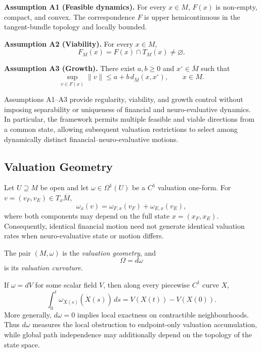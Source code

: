 \documentclass[graybox,natbib]{SNmult}
\providecommand{\1}{}
\renewcommand{\1}{\mathbbm 1}
\begin{document}
\noindent
\textbf{Assumption A1 (Feasible dynamics).}
For every \(x\in M\), \(F(x)\) is non-empty, compact, and convex. The
correspondence \(F\) is upper hemicontinuous in the tangent-bundle topology
and locally bounded.

\medskip

\noindent
\textbf{Assumption A2 (Viability).}
For every \(x\in M\),
\[
F_M(x)
=
F(x)\cap T_M(x)
\neq\varnothing.
\]

\medskip

\noindent
\textbf{Assumption A3 (Growth).}
There exist \(a,b\geq0\) and \(x^\circ\in\overline M\) such that
\[
\sup_{v\in F(x)}\|v\|
\leq
a+b\,d_{\overline M}(x,x^\circ),
\qquad x\in M.
\]

Assumptions A1--A3 provide regularity, viability, and growth control without
imposing separability or uniqueness of financial and neuro-evaluative
dynamics. In particular, the framework permits multiple feasible and viable
directions from a common state, allowing subsequent valuation restrictions to
select among dynamically distinct financial--neuro-evaluative motions.

\subsection{Valuation Geometry}
\label{subsec:valuation-geometry}

Let \(U\supseteq M\) be open and let
\(\omega\in\Omega^1(U)\) be a \(C^1\) valuation one-form. For
\(v=(v_F,v_E)\in T_x\overline M\),
\[
\omega_x(v)
=
\omega_{F,x}(v_F)+\omega_{E,x}(v_E),
\]
where both components may depend on the full state \(x=(x_F,x_E)\).
Consequently, identical financial motion need not generate identical
valuation rates when neuro-evaluative state or motion differs.

\begin{definition}
The pair \((M,\omega)\) is the \emph{valuation geometry}, and
\[
\Omega=d\omega
\]
is its \emph{valuation curvature}.
\end{definition}

If \(\omega=dV\) for some scalar field \(V\), then along every piecewise
\(C^1\) curve \(X\),
\[
\int_0^t
\omega_{X(s)}\!\left(\dot X(s)\right)\,ds
=
V(X(t))-V(X(0)).
\]
More generally, \(d\omega=0\) implies local exactness on contractible
neighbourhoods. Thus \(d\omega\) measures the local obstruction to
endpoint-only valuation accumulation, while global path independence may
additionally depend on the topology of the state space.
\end{document}
